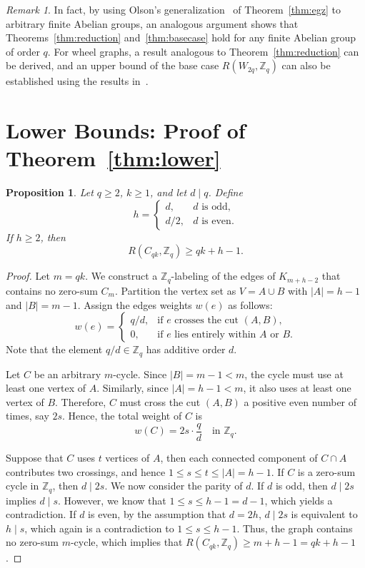 \documentclass[11pt]{article}
\newtheorem{proposition}[theorem]{Proposition}
\theoremstyle{remark}
\newtheorem{remark}[theorem]{Remark}
\newcommand{\Z}{\mathbb Z}
\begin{document}
\begin{remark}
    In fact, by using Olson's generalization~\cite{Olson1976} of Theorem~\ref{thm:egz} to arbitrary finite Abelian groups, an analogous argument shows that Theorems~\ref{thm:reduction} and~\ref{thm:basecase} hold for any finite Abelian group of order $q.$
    For wheel graphs, a result analogous to Theorem~\ref{thm:reduction} can be derived, and an upper bound of the base case $R(W_{2q},\Z_q)$ can also be established using the results in~\cite{Shapiro2026}.
\end{remark}



\section{Lower Bounds: Proof of Theorem~\ref{thm:lower}}


\begin{proposition}\label{prop:divisor-lower}
    Let $q\ge 2$, $k\ge 1$, and let $d\mid q$.
    Define
    \[
        h=
        \begin{cases}
            d,   & d\text{ is odd},  \\
            d/2, & d\text{ is even}.
        \end{cases}
    \]
    If $h\ge 2$, then
    \[
        R(C_{qk},\Z_q)\ge qk+h-1.
    \]
\end{proposition}

\begin{proof}
    Let $m=qk$.
    We construct a $\Z_q$-labeling of the edges of $K_{m+h-2}$ that contains no zero-sum $C_m$.
    Partition the vertex set as $V=A\cup B$ with $|A|=h-1$ and $|B|=m-1$.
    Assign the edges weights $w(e)$ as follows:
    \[
        w(e)=
        \begin{cases}
            q/d, & \text{if } e\text{ crosses the cut }(A,B),              \\
            0,   & \text{if } e\text{ lies entirely within }A\text{ or }B.
        \end{cases}
    \]
    Note that the element $q/d\in\Z_q$ has additive order $d$.

    Let $C$ be an arbitrary $m$-cycle.
    Since $|B|=m-1<m$, the cycle must use at least one vertex of $A$.
    Similarly, since $|A|=h-1<m$, it also uses at least one vertex of $B$.
    Therefore, $C$ must cross the cut $(A,B)$ a positive even number of times, say $2s$.
    Hence, the total weight of $C$ is
    \[
        w(C)=2s\cdot \frac qd\quad\text{in }\Z_q.
    \]

    Suppose that $C$ uses $t$ vertices of $A$, then each connected component of $C\cap A$ contributes two crossings, and hence $1\le s\le t\le |A|=h-1$.
    If $C$ is a zero-sum cycle in $\Z_q$, then $d\mid 2s$.
    We now consider the parity of $d$.
    If $d$ is odd, then $d\mid 2s$ implies $d\mid s$.
    However, we know that $1\le s\le h-1=d-1$, which yields a contradiction.
    If $d$ is even, by the assumption that $d=2h$,
    $d\mid 2s$ is equivalent to $h\mid s$, which again is a contradiction to $1\le s\le h-1$.
    Thus, the graph contains no zero-sum $m$-cycle, which implies that $R(C_{qk},\Z_q)\ge m+h-1=qk+h-1$.
\end{proof}
\end{document}
